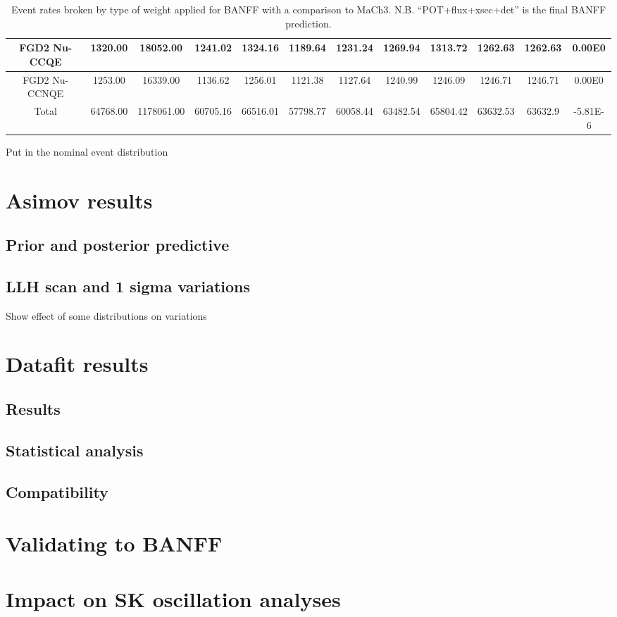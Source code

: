 \begin{sidewaystable}
{\begin{tabular}{| c | c | c | c | c | c | c | c | c | c | c | c |}
			FGD2 Nu-CCQE &  1320.00 &  18052.00 &  1241.02 &  1324.16 &  1189.64 &  1231.24 &  1269.94 &  1313.72 &  1262.63 & 1262.63 & 0.00E0 \\ \hline
			FGD2 Nu-CCNQE &  1253.00 &  16339.00 &  1136.62 &  1256.01 &  1121.38 &  1127.64 &  1240.99 &  1246.09 &  1246.71 & 1246.71 & 0.00E0 \\ \hline
			Total &  64768.00 &  1178061.00 &  60705.16 &  66516.01 &  57798.77 &  60058.44 &  63482.54 &  65804.42 &  63632.53 & 63632.9 & -5.81E-6 \\ \hline
		\end{tabular}
	}
	\caption{Event rates broken by type of weight applied for BANFF with a comparison to MaCh3. N.B. ``POT+flux+xsec+det'' is the final BANFF prediction.}
	\label{tab:eventrate}
\end{sidewaystable}

Put in the nominal event distribution

\section{Asimov results}


\subsection{Prior and posterior predictive}


\subsection{LLH scan and 1 sigma variations}
Show effect of some distributions on variations

\section{Datafit results}

\subsection{Results}

\subsection{Statistical analysis}

\subsection{Compatibility}

\section{Validating to BANFF}

\section{Impact on SK oscillation analyses}
